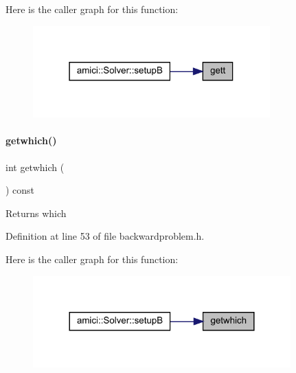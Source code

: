 Here is the caller graph for this function\+:
\nopagebreak
\begin{figure}[H]
\begin{center}
\leavevmode
\includegraphics[width=259pt]{classamici_1_1_backward_problem_a1582a658df3f51a8c88b6f22b4205b3f_icgraph}
\end{center}
\end{figure}
\mbox{\label{classamici_1_1_backward_problem_ac337bf2284c1febeb302019b06c54c3e}} 
\paragraph{\texorpdfstring{getwhich()}{getwhich()}}
{\footnotesize\ttfamily int getwhich (\begin{DoxyParamCaption}{ }\end{DoxyParamCaption}) const}

\begin{DoxyReturn}{Returns}
which 
\end{DoxyReturn}


Definition at line 53 of file backwardproblem.\+h.

Here is the caller graph for this function\+:
\nopagebreak
\begin{figure}[H]
\begin{center}
\leavevmode
\includegraphics[width=281pt]{classamici_1_1_backward_problem_ac337bf2284c1febeb302019b06c54c3e_icgraph}
\end{center}
\end{figure}
\mbox{\label{classamici_1_1_backward_problem_a209a0d59a5a5eebfba1e6db5cb209132}} 
